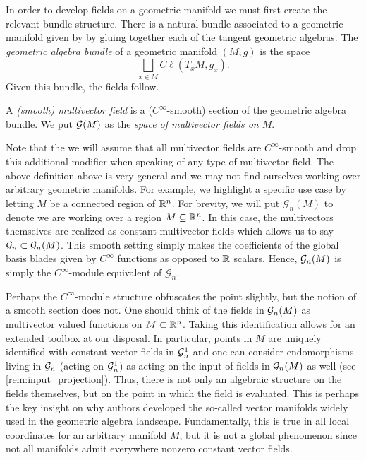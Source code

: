 In order to develop fields on a geometric manifold we must first create the relevant bundle structure. There is a natural bundle associated to a  geometric manifold given by by gluing together each of the tangent geometric algebras. The \emph{geometric algebra bundle} of a geometric manifold $(M,g)$ is the space
\begin{equation}
\bigsqcup_{x \in M} C\ell(T_xM,g_x).
\end{equation}
Given this bundle, the fields follow.
\begin{definition}
A \emph{(smooth) multivector field} is a ($C^{\infty}$-smooth) section of the geometric algebra bundle. We put $\mathcal{G}(M)$ as the \emph{space of multivector fields on $M$}.
\end{definition}
Note that the we will assume that all multivector fields are $C^\infty$-smooth and drop this additional modifier when speaking of any type of multivector field. The above definition above is very general and we may not find ourselves working over arbitrary geometric manifolds. For example, we highlight a specific use case by letting $M$ be a connected region of $\mathbb{R}^n$. For brevity, we will put $\mathcal{G}_n(M)$ to denote we are working over a region $M\subseteq \mathbb{R}^n$. In this case, the multivectors themselves are realized as constant multivector fields which allows us to say $\mathcal{G}_n \subset \mathcal{G}_n(M)$. This smooth setting simply makes the coefficients of the global basis blades given by $C^\infty$ functions as opposed to $\mathbb{R}$ scalars.  Hence, $\mathcal{G}_n(M)$ is simply the $C^{\infty}$-module equivalent of $\mathcal{G}_n$.

Perhaps the $C^\infty$-module structure obfuscates the point slightly, but the notion of a smooth section does not.  One should think of the fields in $\mathcal{G}_n(M)$ as multivector valued functions on $M \subset \mathbb{R}^n$. Taking this identification allows for an extended toolbox at our disposal. In particular, points in $M$ are uniquely identified with constant vector fields in $\mathcal{G}_n^1$ and one can consider endomorphisms living in $\mathcal{G}_n$ (acting on $\mathcal{G}_n^1$) as acting on the input of fields in $\mathcal{G}_n(M)$ as well (see \cref{rem:input_projection}).  Thus, there is not only an algebraic structure on the fields themselves, but on the point in which the field is evaluated.  This is perhaps the key insight on why authors developed the so-called vector manifolds widely used in the geometric algebra landscape. Fundamentally, this is true in all local coordinates for an arbitrary manifold $M$, but it is not a global phenomenon since not all manifolds admit everywhere nonzero constant vector fields. 

